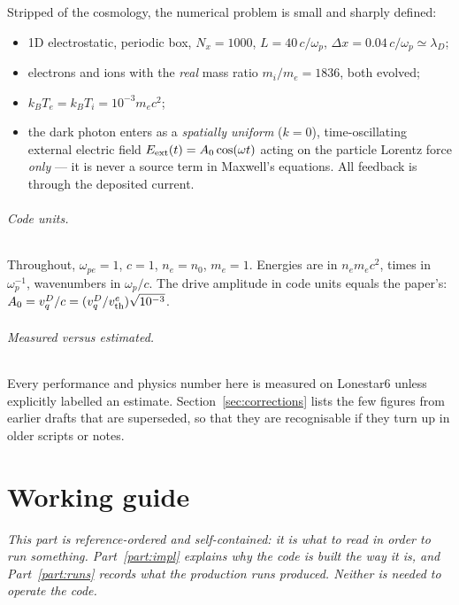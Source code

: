 \documentclass[11pt,a4paper]{article}
\newcommand{\vth}{v_{\rm th}^{e}}
\begin{document}
Stripped of the cosmology, the numerical problem is small and sharply defined:

\begin{itemize}[nosep]
  \item 1D electrostatic, periodic box, $N_x = 1000$, $L = 40\,c/\omega_p$,
        $\Delta x = 0.04\,c/\omega_p \simeq \lambda_D$;
  \item electrons and ions with the \emph{real} mass ratio $m_i/m_e = 1836$, both
        evolved;
  \item $k_B T_e = k_B T_i = 10^{-3} m_e c^2$;
  \item the dark photon enters as a \emph{spatially uniform} ($k=0$), time-oscillating
        external electric field $E_{\rm ext}(t) = A_0\cos(\omega t)$ acting on the
        particle Lorentz force \emph{only} --- it is never a source term in Maxwell's
        equations. All feedback is through the deposited current.
\end{itemize}

\paragraph{Code units.} Throughout, $\omega_{pe} = 1$, $c = 1$, $n_e = n_0$,
$m_e = 1$. Energies are in $n_e m_e c^2$, times in $\omega_p^{-1}$, wavenumbers in
$\omega_p/c$. The drive amplitude in code units equals the paper's:
$A_0 = v_q^D/c = (v_q^D/\vth)\sqrt{10^{-3}}$.

\paragraph{Measured versus estimated.} Every performance and physics number here is
measured on Lonestar6 unless explicitly labelled an estimate.
Section~\ref{sec:corrections} lists the few figures from earlier drafts that are
superseded, so that they are recognisable if they turn up in older scripts or notes.

\clearpage
\part{Working guide}
\label{part:guide}

\noindent\emph{This part is reference-ordered and self-contained: it is what to read in
order to run something. Part~\ref{part:impl} explains why the code is built the way it
is, and Part~\ref{part:runs} records what the production runs produced. Neither is
needed to operate the code.}
\end{document}
